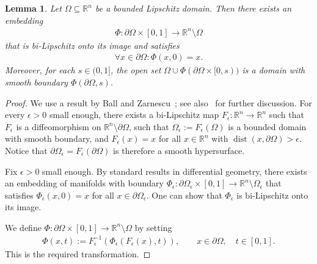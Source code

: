 \documentclass[10pt,a4paper]{amsart}
\newtheorem{lemma}[theorem]{Lemma}
\theoremstyle{definition}
\theoremstyle{remark}
\numberwithin{equation}{section}
\newcommand{\bbR}{{\mathbb R}}
\newcommand{\dist}{\operatorname{dist}}
\newcommand{\Domain}{{\Omega}}
\begin{document}
\begin{lemma}\label{lemma:outer-collar}
    Let $\Domain \subseteq \bbR^{n}$ be a bounded Lipschitz domain. 
    Then there exists an embedding 
    \begin{align*}
        \Phi : \partial\Domain \times [0,1] \to \bbR^{n} \setminus \Domain 
    \end{align*}
    that is bi-Lipschitz onto its image and satisfies 
    \begin{align*}
        \forall x \in \partial\Domain : \Phi(x, 0) = x.
    \end{align*}
    Moreover, for each $s \in (0,1]$, the open set $\Domain \cup \Phi( \partial\Domain \times [0,s) )$ is a domain with smooth boundary $\Phi( \partial\Domain, s )$.
\end{lemma}
\begin{proof}
    We use a result by Ball and Zarnescu~\cite[Theorem~5.1, Remark 5.1]{ball2017partial};
    see also~\cite[Theorem~8.3, Theorem~8.8]{chen2019cauchy} for further discussion. 
For every $\epsilon > 0$ small enough, 
    there exists a bi-Lipschitz map $F_{\epsilon} : \bbR^{n} \to \bbR^{n}$
    such that $F_{\epsilon}$ is a diffeomorphism on $\bbR^{n} \setminus \partial\Domain$,
    such that $\Domain_{\epsilon} := F_{\epsilon}( \Domain )$ is a bounded domain with smooth boundary,
    and $F_{\epsilon}(x) = x$ for all $x \in \bbR^{n}$ with $\dist(x,\partial\Domain) > \epsilon$. 
    Notice that $\partial\Domain_{\epsilon} = F_{\epsilon}(\partial\Domain)$ is therefore a smooth hypersurface. 
    
    Fix $\epsilon > 0$ small enough.     
    By standard results in differential geometry, there exists an embedding of manifolds with boundary 
    $\Phi_{\epsilon} : \partial\Domain_{\epsilon} \times [0,1] \to \bbR^{n} \setminus \Domain_{\epsilon}$
    that satisfies $\Phi_{\epsilon}(x, 0) = x$ for all $x \in \partial\Domain_{\epsilon}$.
    One can show that $\Phi_{\epsilon}$ is bi-Lipschitz onto its image. 
    
    We define $\Phi : \partial\Domain \times [0,1] \to \bbR^{n} \setminus \Domain$ by setting 
    \begin{align*}
        \Phi( x, t ) := F_{\epsilon}^{-1}\left( \Phi_{\epsilon}( F_{\epsilon}(x) , t) \right), \qquad x \in \partial\Domain, \quad t \in [0,1].
    \end{align*}
    This is the required transformation. 
\end{proof}
\end{document}
